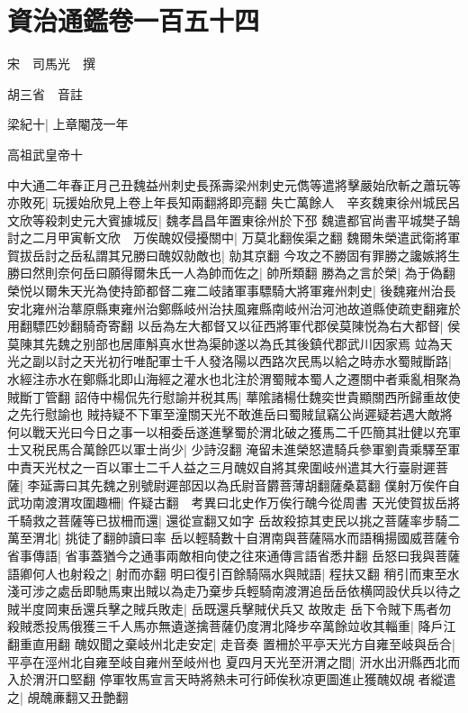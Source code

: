 \section{資治通鑑卷一百五十四}
宋　司馬光　撰

胡三省　音註

梁紀十|{
	上章閹茂一年}


高祖武皇帝十

中大通二年春正月己丑魏益州刺史長孫壽梁州刺史元儁等遣將擊嚴始欣斬之蕭玩等亦敗死|{
	玩援始欣見上卷上年長知兩翻將即亮翻}
失亡萬餘人　辛亥魏東徐州城民呂文欣等殺刺史元大賓據城反|{
	魏孝昌昌年置東徐州於下邳}
魏遣都官尚書平城樊子鵠討之二月甲寅斬文欣　万俟醜奴侵擾關中|{
	万莫北翻俟渠之翻}
魏爾朱榮遣武衛將軍賀拔岳討之岳私謂其兄勝曰醜奴勍敵也|{
	勍其京翻}
今攻之不勝固有罪勝之讒嫉將生勝曰然則奈何岳曰願得爾朱氏一人為帥而佐之|{
	帥所類翻}
勝為之言於榮|{
	為于偽翻}
榮悦以爾朱天光為使持節都督二雍二岐諸軍事驃騎大將軍雍州刺史|{
	後魏雍州治長安北雍州治蕐原縣東雍州治鄭縣岐州治扶風雍縣南岐州治河池故道縣使疏吏翻雍於用翻驃匹妙翻騎奇寄翻}
以岳為左大都督又以征西將軍代郡侯莫陳悦為右大都督|{
	侯莫陳其先魏之别部也居庫斛真水世為渠帥遂以為氏其後鎮代郡武川因家焉}
竝為天光之副以討之天光初行唯配軍士千人發洛陽以西路次民馬以給之時赤水蜀賊斷路|{
	水經注赤水在鄭縣北即山海經之灌水也北注於渭蜀賊本蜀人之遷關中者乘亂相聚為賊斷丁管翻}
詔侍中楊侃先行慰諭并税其馬|{
	蕐隂諸楊仕魏奕世貴顯關西所歸重故使之先行慰諭也}
賊持疑不下軍至潼關天光不敢進岳曰蜀賊鼠竊公尚遲疑若遇大敵將何以戰天光曰今日之事一以相委岳遂進擊蜀於渭北破之獲馬二千匹簡其壯健以充軍士又税民馬合萬餘匹以軍士尚少|{
	少詩沒翻}
淹留未進榮怒遣騎兵參軍劉貴乘驛至軍中責天光杖之一百以軍士二千人益之三月醜奴自將其衆圍岐州遣其大行臺尉遲菩薩|{
	李延壽曰其先魏之别號尉遲部因以為氏尉音欝菩薄胡翻薩桑葛翻}
僕射万俟仵自武功南渡渭攻圍趣柵|{
	仵疑古翻　考異曰北史作万俟行醜今從周書}
天光使賀拔岳將千騎救之菩薩等已拔柵而還|{
	還從宣翻又如字}
岳故殺掠其吏民以挑之菩薩率步騎二萬至渭北|{
	挑徒了翻帥讀曰率}
岳以輕騎數十自渭南與菩薩隔水而語稱揚國威菩薩令省事傳語|{
	省事蓋猶今之通事兩敵相向使之往來通傳言語省悉井翻}
岳怒曰我與菩薩語卿何人也射殺之|{
	射而亦翻}
明曰復引百餘騎隔水與賊語|{
	程扶又翻}
稍引而東至水淺可涉之處岳即馳馬東出賊以為走乃棄步兵輕騎南渡渭追岳岳依横岡設伏兵以待之賊半度岡東岳還兵擊之賊兵敗走|{
	岳既還兵擊賊伏兵又故敗走}
岳下令賊下馬者勿殺賊悉投馬俄獲三千人馬亦無遺遂擒菩薩仍度渭北降步卒萬餘竝收其輜重|{
	降戶江翻重直用翻}
醜奴聞之棄岐州北走安定|{
	走音奏}
置柵於平亭天光方自雍至岐與岳合|{
	平亭在涇州北自雍至岐自雍州至岐州也}
夏四月天光至汧渭之間|{
	汧水出汧縣西北而入於渭汧口堅翻}
停軍牧馬宣言天時將熱未可行師俟秋凉更圖進止獲醜奴覘者縱遣之|{
	覘醜亷翻又丑艶翻}
